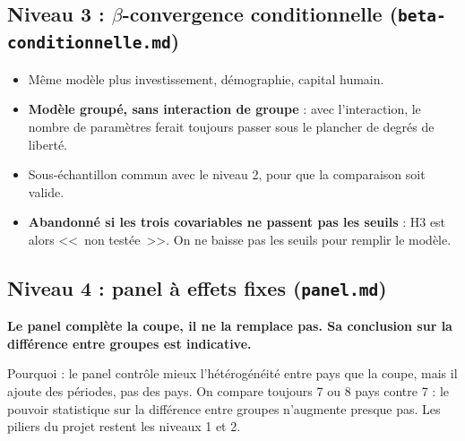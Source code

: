 \documentclass[14pt,a4paper]{article}
\newcommand{\bet}{\texorpdfstring{$\beta$}{beta}}
\begin{document}
	\subsection{Niveau 3 : \bet-convergence conditionnelle (\texttt{beta-conditionnelle.md})}
	\begin{itemize}
		\item Même modèle plus investissement, démographie, capital humain.
		\item \textbf{Modèle groupé, sans interaction de groupe} : avec l'interaction, le nombre de paramètres ferait toujours passer sous le plancher de degrés de liberté.
		\item Sous-échantillon commun avec le niveau 2, pour que la comparaison soit valide.
		\item \textbf{Abandonné si les trois covariables ne passent pas les seuils} : H3 est alors <<~non testée~>>. On ne baisse pas les seuils pour remplir le modèle.
	\end{itemize}
	
	\subsection{Niveau 4 : panel à effets fixes (\texttt{panel.md})}
	
	\begin{encadre}
		\textbf{Le panel complète la coupe, il ne la remplace pas. Sa conclusion sur la différence entre groupes est indicative.}
	\end{encadre}
	
	Pourquoi : le panel contrôle mieux l'hétérogénéité entre pays que la coupe, mais il ajoute des périodes, pas des pays. On compare toujours 7 ou 8 pays contre 7 : le pouvoir statistique sur la différence entre groupes n'augmente presque pas. Les piliers du projet restent les niveaux 1 et 2.
	
\end{document}
